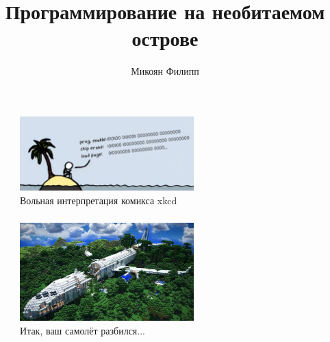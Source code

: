 \documentclass[aspectratio=169, pdf, 8pt, unicode]{beamer}
\title[Программирование на необитаемом острове]{Программирование на необитаемом острове}
\author{Микоян Филипп}
\institute[МФТИ]{
    Московский физико-технический институт (национальный исследовательский университет)
}
\date{}
\begin{document}


\begin{frame}[fragile]
\titlepage
\vspace*{-1cm}
\begin{figure}[H]
	\centering
	\includegraphics[width=0.6\textwidth]{resources/xkcd.png}
	\caption{Вольная интерпретация комикса xkcd}
\end{figure}
\end{frame}

\begin{frame}[fragile]
\frametitle{}
	\begin{figure}[H]
	      \centering
	      \includegraphics[width=0.6\textwidth]{resources/minecraft_plane.jpg}
	      \caption{Итак, ваш самолёт разбился...}
	\end{figure}
\end{frame}
\end{document}
